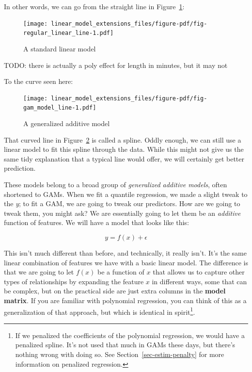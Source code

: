\documentclass[
  letterpaper,
]{krantz}
\begin{document}
In other words, we can go from the straight line in
Figure~\ref{fig-regular_linear_line}:

\begin{figure}

{\centering \texttt{[image: linear\_model\_extensions\_files/figure-pdf/fig-regular\_linear\_line-1.pdf]}

}

\caption{\label{fig-regular_linear_line}A standard linear model}

\end{figure}

TODO: there is actually a poly effect for length in minutes, but it may
not

To the curve seen here:

\begin{figure}

{\centering \texttt{[image: linear\_model\_extensions\_files/figure-pdf/fig-gam\_model\_line-1.pdf]}

}

\caption{\label{fig-gam_model_line}A generalized additive model}

\end{figure}

That curved line in Figure~\ref{fig-gam_model_line} is called a spline.
Oddly enough, we can still use a linear model to fit this spline through
the data. While this might not give us the same tidy explanation that a
typical line would offer, we will certainly get better prediction.

These models belong to a broad group of \emph{generalized additive
models}, often shortened to GAMs. When we fit a quantile regression, we
made a slight tweak to the \emph{y}; to fit a GAM, we are going to tweak
our predictors. How are we going to tweak them, you might ask? We are
essentially going to let them be an \emph{additive} function of
features. We will have a model that looks like this:

\[
y = f(x) + \epsilon
\]

This isn't much different than before, and technically, it really isn't.
It's the same linear combination of features we have with a basic linear
model. The difference is that we are going to let \(f(x)\) be a function
of \(x\) that allows us to capture other types of relationships by
expanding the feature \(x\) in different ways, some that can be complex,
but on the practical side are just extra columns in the \textbf{model
matrix}. If you are familiar with polynomial regression, you can think
of this as a generalization of that approach, but which is identical in
spirit\footnote{If we penalized the coefficients of the polynomial
  regression, we would have a penalized spline. It's not used that much
  in GAMs these days, but there's nothing wrong with doing so. See
  Section~\ref{sec-estim-penalty} for more information on penalized
  regression.}.
\end{document}
